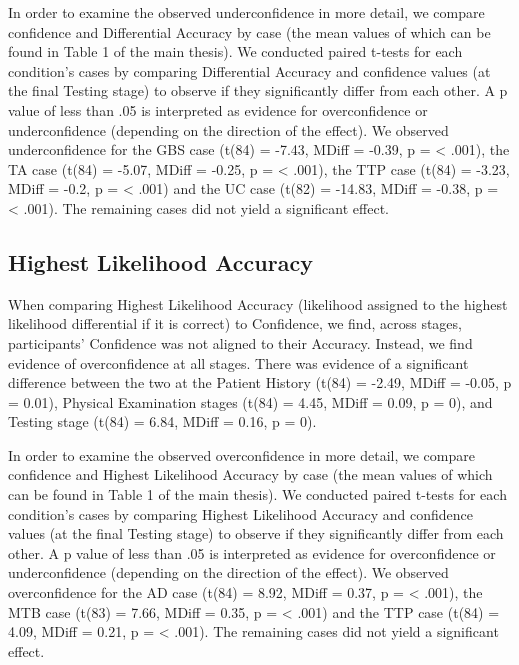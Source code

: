 \documentclass[
]{article}
\begin{document}
In order to examine the observed underconfidence in more detail, we
compare confidence and Differential Accuracy by case (the mean values of
which can be found in Table 1 of the main thesis). We conducted paired
t-tests for each condition's cases by comparing Differential Accuracy
and confidence values (at the final Testing stage) to observe if they
significantly differ from each other. A p value of less than .05 is
interpreted as evidence for overconfidence or underconfidence (depending
on the direction of the effect). We observed underconfidence for the GBS
case (t(84) = -7.43, MDiff = -0.39, p = \textless{} .001), the TA case
(t(84) = -5.07, MDiff = -0.25, p = \textless{} .001), the TTP case
(t(84) = -3.23, MDiff = -0.2, p = \textless{} .001) and the UC case
(t(82) = -14.83, MDiff = -0.38, p = \textless{} .001). The remaining
cases did not yield a significant effect.

\subsection{Highest Likelihood
Accuracy}\label{highest-likelihood-accuracy}

When comparing Highest Likelihood Accuracy (likelihood assigned to the
highest likelihood differential if it is correct) to Confidence, we
find, across stages, participants' Confidence was not aligned to their
Accuracy. Instead, we find evidence of overconfidence at all stages.
There was evidence of a significant difference between the two at the
Patient History (t(84) = -2.49, MDiff = -0.05, p = 0.01), Physical
Examination stages (t(84) = 4.45, MDiff = 0.09, p = 0), and Testing
stage (t(84) = 6.84, MDiff = 0.16, p = 0).

In order to examine the observed overconfidence in more detail, we
compare confidence and Highest Likelihood Accuracy by case (the mean
values of which can be found in Table 1 of the main thesis). We
conducted paired t-tests for each condition's cases by comparing Highest
Likelihood Accuracy and confidence values (at the final Testing stage)
to observe if they significantly differ from each other. A p value of
less than .05 is interpreted as evidence for overconfidence or
underconfidence (depending on the direction of the effect). We observed
overconfidence for the AD case (t(84) = 8.92, MDiff = 0.37, p =
\textless{} .001), the MTB case (t(83) = 7.66, MDiff = 0.35, p =
\textless{} .001) and the TTP case (t(84) = 4.09, MDiff = 0.21, p =
\textless{} .001). The remaining cases did not yield a significant
effect.
\end{document}
